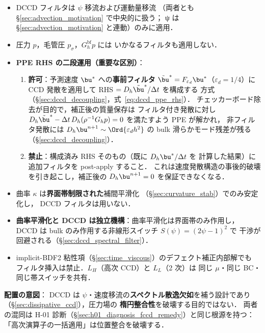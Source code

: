 \begin{itemize}[noitemsep]
  \item DCCD フィルタは $\psi$ 移流および運動量移流
        （両者とも \S\ref{sec:advection_motivation} で中央的に扱う；
        ψ は \S\ref{sec:advection_motivation} と連動）のみに適用．
  \item 圧力 $p$，毛管圧 $p_\sigma$，$G_h^\text{bf} p$ には
        いかなるフィルタも適用しない．
  \item \textbf{PPE RHS の二段運用（重要な区別）}：
        \begin{enumerate}[label=(\alph*),noitemsep]
          \item \textbf{許可}：予測速度 $\bu^*$ への\textbf{事前フィルタ}
                $\tilde{\bu}^* = F_{\varepsilon_d}\bu^*$（$\varepsilon_d = 1/4$）に
                CCD 発散を適用して RHS $= D_h\tilde{\bu}^*/\Delta t$ を構成する
                方式（§\ref{sec:dccd_decoupling}，式~\eqref{eq:dccd_ppe_rhs}）．
                チェッカーボード除去が目的で，補正後の質量保存は
                フィルタ付き発散に対し $D_h\tilde{\bu}^*-\Delta t\,D_h(\rho^{-1}G_h p)=0$
                を満たすよう PPE が解かれ，
                非フィルタ発散には $D_h\bu^{n+1}\sim\Ord{\varepsilon_d h^2}$ の
                bulk 滑らかモード残差が残る（§\ref{sec:dccd_decoupling}）．
          \item \textbf{禁止}：構成済み RHS そのもの（既に $D_h\bu^*/\Delta t$ を
                計算した結果）に追加フィルタを post-apply すること．
                これは速度発散構造の事後的破壊を引き起こし，補正後の
                $D_h\bu^{n+1}=0$ を保証できなくなる．
        \end{enumerate}
  \item 曲率 $\kappa$ は\textbf{界面帯制限された}補間平滑化
        （\S\ref{sec:curvature_stab}）でのみ安定化し，
        DCCD フィルタは用いない．
  \item \textbf{曲率平滑化と DCCD は独立機構}：曲率平滑化は界面帯のみ作用し，
        DCCD は bulk のみ作用する非線形スイッチ $S(\psi)=(2\psi-1)^2$ で
        干渉が回避される（§\ref{sec:dccd_spectral_filter}）．
  \item implicit-BDF2 粘性項（§\ref{sec:time_viscous}）のデフェクト補正内部解でも
        フィルタ挿入は禁止．$L_H$（高次 CCD）と $L_L$（2 次）は
        同じ $\mu$・同じ BC・同じ帯スイッチを共有．
\end{itemize}

\noindent\textbf{配置の意図}：
DCCD は $\psi$・速度移流の\textbf{スペクトル散逸欠如}を補う設計であり
（§\ref{sec:dissipative_ccd}），圧力場の
\textbf{楕円整合性}を破壊する目的ではない．
両者の混同は H-01 診断（§\ref{sec:h01_diagnosis_fccd_remedy}）と同じ根源を持つ：
「高次演算子の一括適用」は位置整合を破壊する．

